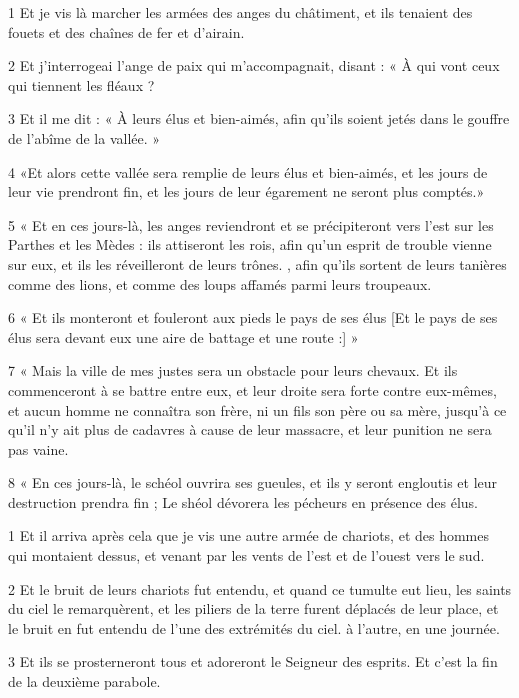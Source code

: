 
\par 1 Et je vis là marcher les armées des anges du châtiment, et ils tenaient des fouets et des chaînes de fer et d'airain.
\par 2 Et j'interrogeai l'ange de paix qui m'accompagnait, disant : « À qui vont ceux qui tiennent les fléaux ?
\par 3 Et il me dit : « À leurs élus et bien-aimés, afin qu'ils soient jetés dans le gouffre de l'abîme de la vallée. »
\par 4 «Et alors cette vallée sera remplie de leurs élus et bien-aimés, et les jours de leur vie prendront fin, et les jours de leur égarement ne seront plus comptés.»
\par 5 « Et en ces jours-là, les anges reviendront et se précipiteront vers l'est sur les Parthes et les Mèdes : ils attiseront les rois, afin qu'un esprit de trouble vienne sur eux, et ils les réveilleront de leurs trônes. , afin qu'ils sortent de leurs tanières comme des lions, et comme des loups affamés parmi leurs troupeaux.
\par 6 « Et ils monteront et fouleront aux pieds le pays de ses élus [Et le pays de ses élus sera devant eux une aire de battage et une route :] »
\par 7 « Mais la ville de mes justes sera un obstacle pour leurs chevaux. Et ils commenceront à se battre entre eux, et leur droite sera forte contre eux-mêmes, et aucun homme ne connaîtra son frère, ni un fils son père ou sa mère, jusqu'à ce qu'il n'y ait plus de cadavres à cause de leur massacre, et leur punition ne sera pas vaine.
\par 8 « En ces jours-là, le schéol ouvrira ses gueules, et ils y seront engloutis et leur destruction prendra fin ; Le shéol dévorera les pécheurs en présence des élus.


\par 1 Et il arriva après cela que je vis une autre armée de chariots, et des hommes qui montaient dessus, et venant par les vents de l'est et de l'ouest vers le sud.
\par 2 Et le bruit de leurs chariots fut entendu, et quand ce tumulte eut lieu, les saints du ciel le remarquèrent, et les piliers de la terre furent déplacés de leur place, et le bruit en fut entendu de l'une des extrémités du ciel. à l'autre, en une journée.
\par 3 Et ils se prosterneront tous et adoreront le Seigneur des esprits. Et c'est la fin de la deuxième parabole.

